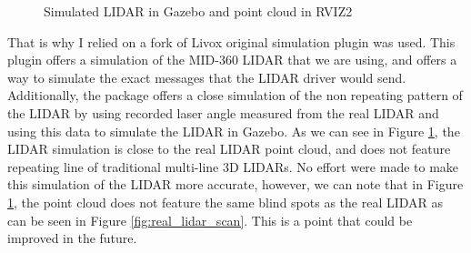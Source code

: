 \documentclass[11pt]{article}
\begin{document}
                \begin{figure}[H]
                    \centering
                    \caption{Simulated LIDAR in Gazebo and point cloud in RVIZ2}
                    \label{fig:lidar_simulation}
                \end{figure}
        
        That is why I relied on a fork \cite{livox_laser_simulation_RO2} of Livox original simulation plugin was used. This plugin offers a simulation of the MID-360 LIDAR that we are using, and offers a way to simulate the exact messages that the LIDAR driver would send. Additionally, the package offers a close simulation of the non repeating pattern of the LIDAR by using recorded laser angle measured from the real LIDAR and using this data to simulate the LIDAR in Gazebo. As we can see in Figure \ref{fig:lidar_simulation}, the LIDAR simulation is close to the real LIDAR point cloud, and does not feature repeating line of traditional multi-line 3D LIDARs. No effort were made to make this simulation of the LIDAR more accurate, however, we can note that in Figure \ref{fig:lidar_simulation}, the point cloud does not feature the same blind spots as the real LIDAR as can be seen in Figure \ref{fig:real_lidar_scan}. This is a point that could be improved in the future.
\end{document}
